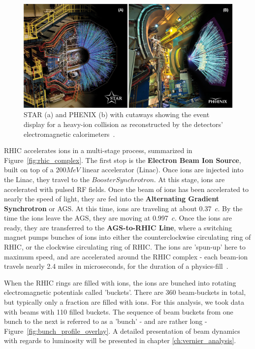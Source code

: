 \begin{figure}[ht]
  \centering
  \includegraphics[width=\linewidth]{./figures/rhic_graphics_fig2-hr.jpg}
  \caption{
    STAR (a) and PHENIX (b) with cutaways showing the event display for a
    heavy-ion collision as reconstructed by the detectors' electromagnetic
    calorimeters~\cite{Walsh2012}.
  }
  \label{fig:phenix_and_star}
\end{figure}

RHIC accelerates ions in a multi-stage process, summarized in
Figure~\ref{fig:rhic_complex}. The first stop is the \textbf{Electron Beam Ion
Source}, built on top of a $200 MeV$ linear accelerator (Linac). Once ions are
injected into the Linac, they travel to the $Booster Synchrotron$.  At this
stage, ions are accelerated with pulsed RF fields. Once the beam of ions has
been accelerated to nearly the speed of light, they are fed into the
\textbf{Alternating Gradient Synchrotron} or AGS. At this time, ions are
traveling at about 0.37~$c$. By the time the ions leave the AGS, they are moving
at 0.997~$c$. Once the ions are ready, they are transferred to the
\textbf{AGS-to-RHIC Line}, where a switching magnet pumps bunches of ions into
either the counterclockwise circulating ring of RHIC, or the clockwise
circulating ring of RHIC. The ions are 'spun-up' here to maximum speed, and are
accelerated around the RHIC complex - each beam-ion travels nearly 2.4 miles in
microseconds, for the duration of a physics-fill~\cite{RHIC2016}.

When the RHIC rings are filled with ions, the ions are bunched into rotating
electromagnetic potentials called 'buckets'. There are 360 beam-buckets in
total, but typically only a fraction are filled with ions. For this analysis, we
took data with beams with 110 filled buckets. The sequence of beam buckets from
one bunch to the next is referred to as a 'bunch' - and are rather long -
Figure~\ref{fig:bunch_profile_overlay}. A detailed presentation of beam dynamics
with regards to luminosity will be presented in chapter
\ref{ch:vernier_analysis}.

